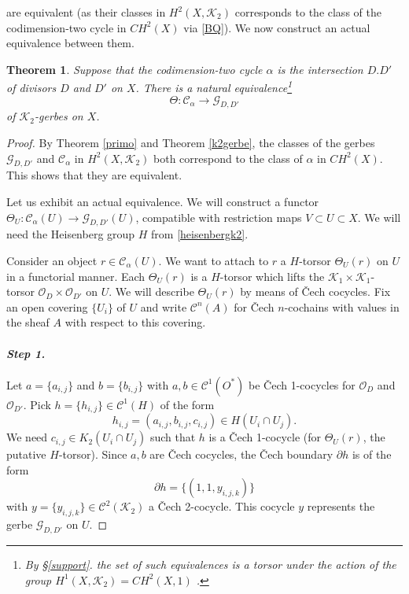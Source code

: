 \documentclass{amsart}
\numberwithin{equation}{subsection}
\newtheorem{theorem}{Theorem}[section]
\theoremstyle{remark}
\theoremstyle{remark}
\newcommand{\cC}{\mathcal{C}}
\newcommand{\cG}{\mathcal{G}}
\newcommand{\cK}{\mathcal{K}}
\newcommand{\cO}{\mathcal{O}}
\begin{document}
are equivalent (as their classes in $H^2(X, \cK_2)$ corresponds to the class of the codimension-two cycle in $CH^2(X)$ via \eqref{BQ}). We now construct an actual equivalence between them. 
\begin{theorem}\label{comparison} Suppose that the codimension-two cycle $\alpha$ is the intersection $D.D'$ of divisors $D$ and $D'$ on $X$. There is a natural equivalence\footnote{By \S \ref{support}. the set of such equivalences is a torsor under the action of the group $H^1(X, \cK_2) =CH^2(X,1)$  \cite[\S 2.1]{Stach}.}
   \begin{equation*}
     \Theta: \cC_{\alpha} \to \cG_{D, D'}
   \end{equation*}
   of $\cK_2$-gerbes on $X$.
 \end{theorem}
 \begin{proof} 
 
 
 By Theorem \ref{primo} and Theorem \ref{k2gerbe}, the classes of the gerbes $\cG_{D,D'}$ and
 $\cC_{\alpha}$  in $H^2(X, \cK_2)$ both correspond to the class of $\alpha$ in
 $CH^2(X)$. This shows that they are equivalent.

 Let us exhibit an actual equivalence. We will construct a functor $\Theta_U:
 \cC_{\alpha}(U) \to \cG_{D, D'}(U)$, compatible with restriction maps $V\subset
 U\subset X$.  We will need the Heisenberg group $H$ from \eqref{heisenbergk2}.
 
 Consider an object $r \in \cC_{\alpha}(U)$. We want to attach to $r$ a $H$-torsor $\Theta_U(r)$ on $U$ in a functorial manner. Each $\Theta_U(r)$ is a $H$-torsor 
which lifts the $\cK_1 \times \cK_1$-torsor $\cO_D \times \cO_{D'}$ on $U$. 
We will describe $\Theta_U(r)$ by means of \v Cech cocycles. Fix an open covering $\{U_i\}$ of $U$ and write $\cC^n(A)$ for \v Cech $n$-cochains with values in the sheaf $A$ with respect to this covering.\medskip

\paragraph{\textit{Step 1.}} Let $a= \{a_{i,j}\}$ and $b = \{b_{i,j}\}$ with $a,b \in \cC^1(O^*)$ be \v Cech 1-cocycles for $\cO_D$ and $\cO_{D'}$. Pick $h = \{h_{i,j}\} \in \cC^1(H)$ of the form
\begin{equation*}
  h_{i,j} = (a_{i,j}, b_{i,j}, c_{i,j}) \in H(U_i\cap U_j). 
\end{equation*}
We need $c_{i,j} \in K_2(U_i \cap U_j)$ such that $h$ is a \v Cech 1-cocycle (for $\Theta_U(r)$, the putative $H$-torsor). 
 Since $a,b$ are \v Cech cocycles, the \v Cech boundary $\partial h$ is of the form
 \begin{equation*}
  \partial h = \{(1,1, y_{i,j,k})\} 
 \end{equation*}
with $y =\{y_{i,j,k}\} \in \cC^2(\cK_2)$ a \v Cech 2-cocycle. This cocycle $y$
represents the gerbe $\cG_{D,D'}$ on $U$. \vspace*{1em}
  

\end{proof}
\end{document}
